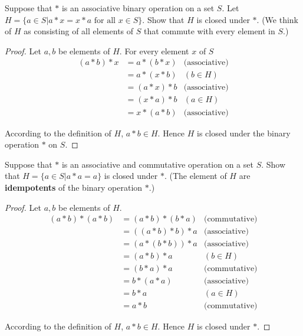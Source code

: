 \begin{exercise}
    Suppose that $*$ is an associative binary operation on a set $S$. Let $H = \{ a \in S \vert a * x = x * a \text{ for all } x\in S \}$. Show that $H$ is closed under $*$. (We think of $H$ as consisting of all elements of $S$ that commute with every element in $S$.)
\end{exercise}

\begin{proof}
    Let $a, b$ be elements of $H$. For every element $x$ of $S$
    \begin{align*}
        (a * b) * x & = a * (b * x) & \text{(associative)} \\
                    & = a * (x * b) & (b\in H)             \\
                    & = (a * x) * b & \text{(associative)} \\
                    & = (x * a) * b & (a\in H)             \\
                    & = x * (a * b) & \text{(associative)}
    \end{align*}

    According to the definition of $H$, $a * b\in H$. Hence $H$ is closed under the binary operation $*$ on $S$.
\end{proof}

\begin{exercise}
    Suppose that $*$ is an associative and commutative operation on a set $S$. Show that $H = \{ a\in S \vert a * a = a \}$ is closed under $*$. (The element of $H$ are \textbf{idempotents} of the binary operation $*$.)
\end{exercise}

\begin{proof}
    Let $a, b$ be elements of $H$.
    \begin{align*}
        (a * b) * (a * b) & = (a * b) * (b * a) & \text{(commutative)} \\
                          & = ((a * b) * b) * a & \text{(associative)} \\
                          & = (a * (b * b)) * a & \text{(associative)} \\
                          & = (a * b) * a       & (b\in H)             \\
                          & = (b * a) * a       & \text{(commutative)} \\
                          & = b * (a * a)       & \text{(associative)} \\
                          & = b * a             & (a\in H)             \\
                          & = a * b             & \text{(commutative)}
    \end{align*}

    According to the definition of $H$, $a * b\in H$. Hence $H$ is closed under $*$.
\end{proof}

